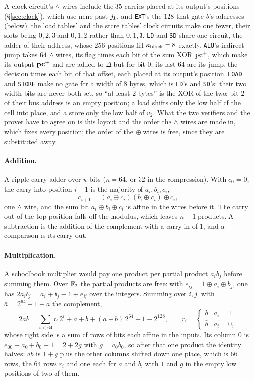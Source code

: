 A clock circuit's $\wedge$ wires include the $35$ carries placed at its output's positions (\S\ref{sec:clock}), which use none past $j_{\mathbf{1}}$, and \texttt{EXT}'s the $128$ that gate $b$'s addresses (below); the load tables' and the store tables' clock circuits make one fewer, their slots being $0,2,3$ and $0,1,2$ rather than $0,1,3$. \texttt{LD} and \texttt{SD} share one circuit, the adder of their address, whose $256$ positions fill $\kappa_{\mathrm{block}}=8$ exactly. \texttt{ALU}'s indirect jump takes $64$ $\wedge$ wires, its flag times each bit of the sum XOR $\mathbf{pc}^{+}$, which make its output $\mathbf{pc}^{+}$ and are added to $\Delta$ but for bit $0$; its last $64$ are its jump, the decision times each bit of that offset, each placed at its output's position. \texttt{LOAD} and \texttt{STORE} make no gate for a width of $8$ bytes, which is \texttt{LD}'s and \texttt{SD}'s: their two width bits are never both set, so ``at least $2$ bytes'' is the XOR of the two; bit $2$ of their bus address is an empty position; a load shifts only the low half of the cell into place, and a store only the low half of $v_2$.
What the two verifiers and the prover have to agree on is this layout and the order the $\wedge$ wires are made in, which fixes every position; the order of the $\oplus$ wires is free, since they are substituted away.

\paragraph{Addition.} A ripple-carry adder over $n$ bits ($n=64$, or $32$ in the compression). With $c_0=0$, the carry into position $i+1$ is the majority of $a_i,b_i,c_i$,
\[
c_{i+1}=(a_i\oplus c_i)(b_i\oplus c_i)\oplus c_i ,
\]
one $\wedge$ wire, and the sum bit $a_i\oplus b_i\oplus c_i$ is affine in the wires before it. The carry out of the top position falls off the modulus, which leaves $n-1$ products. A subtraction is the addition of the complement with a carry in of $1$, and a comparison is its carry out.

\paragraph{Multiplication.} A schoolbook multiplier would pay one product per partial product $a_ib_j$ before summing them. Over $\mathbb{F}_2$ the partial products are free: with $e_{ij}=1\oplus a_i\oplus b_j$, one has $2a_ib_j=a_i+b_j-1+e_{ij}$ over the integers. Summing over $i,j$, with $\bar a=2^{64}-1-a$ the complement,
\[
2ab=\sum_{i<64}r_i\,2^{i}+\bar a+\bar b+(a+b)\,2^{64}+1-2^{128},\qquad r_i=\begin{cases}b&a_i=1\\ \bar b&a_i=0,\end{cases}
\]
whose right side is a sum of rows of bits each affine in the inputs. Its column $0$ is $e_{00}+\bar a_0+\bar b_0+1=2+2g$ with $g=\bar a_0\bar b_0$, so after that one product the identity halves: $ab$ is $1+g$ plus the other columns shifted down one place, which is $66$ rows, the $64$ rows $r_i$ and one each for $a$ and $b$, with $1$ and $g$ in the empty low positions of two of them.

